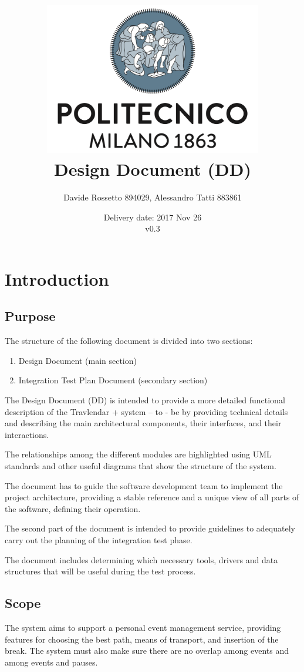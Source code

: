 \documentclass{article}
\title{ 
	\includegraphics[width=95mm]{img/PolimiLogo.png} \\
	\bigskip
	Design Document (DD)
}
\author{
	Davide Rossetto 894029, Alessandro Tatti 883861
}
\date{
	Delivery date: 2017 Nov 26\\
	\bigskip v0.3
}
\begin{document}
	
\maketitle
\newpage
\tableofcontents
\newpage
	
	
	\section{Introduction}
	

	
	\subsection{Purpose}
	The structure of the following document is divided into two sections:
	\begin{enumerate}
	\item Design Document (main section)
	\item Integration Test Plan Document (secondary section)
	\end{enumerate}

	\bigskip
	The Design Document (DD) is intended to provide a more detailed functional description of the Travlendar + system – to - be by providing technical details and describing the main architectural components, their interfaces, and their interactions.
	
	The relationships among the different modules are highlighted using UML standards and other useful diagrams that show the structure of the system.
	
	The document has to guide the software development team to implement the project architecture, providing a stable reference and a unique view of all parts of the software, defining their operation.

	\bigskip
	The second part of the document is intended to provide guidelines to adequately carry out the planning of the integration test phase.
	
	The document includes determining which necessary tools, drivers and data structures that will be useful during the test process.

	
	
	\subsection{Scope}
	The system aims to support a personal event management service, providing features for choosing the best path, means of transport, and insertion of the break. The system must also make sure there are no overlap among events and among events and pauses.
\end{document}
